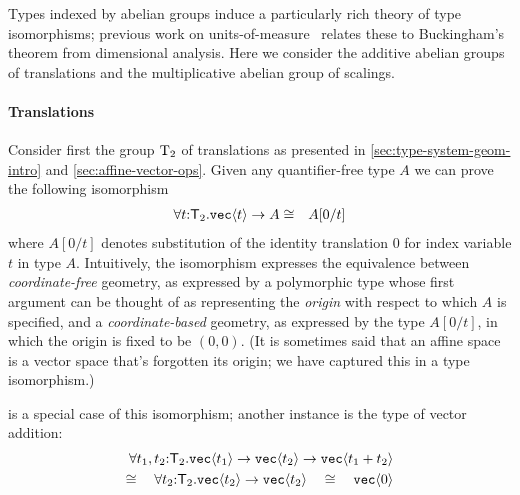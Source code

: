 Types indexed by abelian groups induce a particularly rich theory of
type isomorphisms; previous work on units-of-measure~\cite{kennedy97relational} relates
these to Buckingham's theorem from dimensional analysis. Here we consider the additive 
abelian groups of translations and the multiplicative abelian group of scalings.

\paragraph{Translations} 
Consider first the group $\mathrm{T}_2$ of translations as presented in
\autoref{sec:type-system-geom-intro} and \autoref{sec:affine-vector-ops}. 
Given any quantifier-free type $A$ we can prove the following isomorphism
\begin{eqnarray*}
\forall t\mathord:\mathsf{T}_2.\textup{\texttt{vec}}\langle t \rangle\to A
& \cong &
A[0/t]
\end{eqnarray*}
where $A[0/t]$ denotes substitution of the identity translation $0$
for index variable $t$ in type $A$.  Intuitively, the isomorphism
expresses the equivalence between \emph{coordinate-free} geometry, as
expressed by a polymorphic type whose first argument can be thought of
as representing the \emph{origin} with respect to which $A$ is
specified, and a \emph{coordinate-based} geometry, as expressed by the
type $A[0/t]$, in which the origin is fixed to be $(0,0)$. (It is sometimes said
that an affine space is a vector space that's forgotten its origin; we have captured
this in a type isomorphism.)

 is a special case of this isomorphism; another instance is the
type of vector addition:
\begin{eqnarray*}
\forall t_1,t_2\mathord:\mathsf{T}_2.\textup{\texttt{vec}}\langle t_1 \rangle\to\textup{\texttt{vec}}\langle t_2 \rangle\to\textup{\texttt{vec}}\langle t_1+t_2 \rangle\\
\cong\quad
\forall t_2\mathord:\mathsf{T}_2.\textup{\texttt{vec}}\langle t_2 \rangle\to\textup{\texttt{vec}}\langle t_2 \rangle\quad\cong\quad
\textup{\texttt{vec}}\langle 0 \rangle
\end{eqnarray*}

